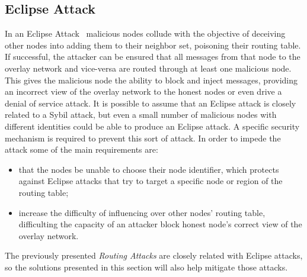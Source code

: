 \subsection{Eclipse Attack}
In an Eclipse Attack~\cite{Singh2006} malicious nodes collude with the objective of deceiving other nodes into adding them to their neighbor set, poisoning their routing table.
If successful, the attacker can be ensured that all messages from that node to the overlay network and vice-versa are routed through at least one malicious node.
This gives the malicious node the ability to block and inject messages, providing an incorrect view of the overlay network to the honest nodes or even drive a denial of service attack.
It is possible to assume that an Eclipse attack is closely related to a Sybil attack, but even a small number of malicious nodes with different identities could be able to produce an Eclipse attack.
A specific security mechanism is required to prevent this sort of attack.
In order to impede the attack some of the main requirements are:
\begin{itemize}
	\item that the nodes be unable to choose their node identifier, which protects against Eclipse attacks that try to target a specific node or region of the routing table;
	\item increase the difficulty of influencing over other nodes' routing table, difficulting the capacity of an attacker block honest node's correct view of the overlay network.
\end{itemize}
The previously presented \textit{Routing Attacks} are closely related with Eclipse attacks, so the solutions presented in this section will also help mitigate those attacks.

